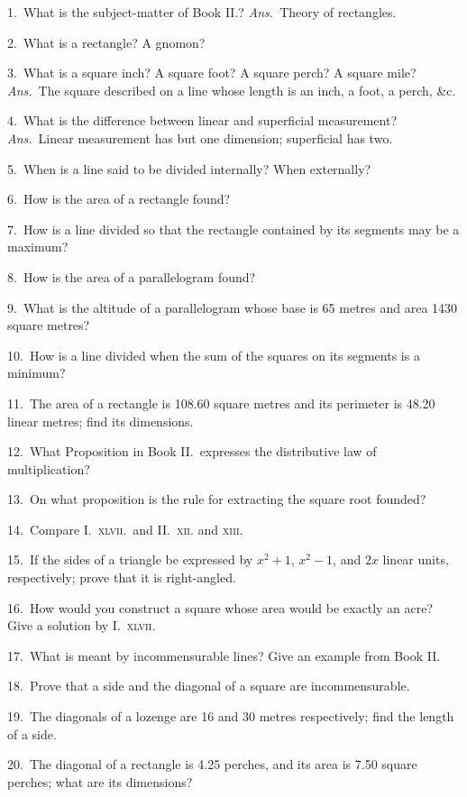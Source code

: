 \documentclass[oneside]{book}
\begin{document}
\begin{footnotesize}
1.~What is the subject-matter of Book II\@.? \emph{Ans.}\ Theory of
rectangles.

2.~What is a rectangle? A gnomon?

3.~What is a square inch? A square foot? A square perch?
A square mile? \emph{Ans.}\ The square described on a line whose
length is an inch, a foot, a perch, \&c.

4.~What is the difference between linear and superficial measurement?
\emph{Ans.}\ Linear measurement has but one dimension;
superficial has two.

5.~When is a line said to be divided internally? When externally?

6.~How is the area of a rectangle found?

7.~How is a line divided so that the rectangle contained by its
segments may be a maximum?

8.~How is the area of a parallelogram found?

9.~What is the altitude of a parallelogram whose base is 65
metres and area 1430 square metres?

10.~How is a line divided when the sum of the squares on its
segments is a minimum?

11.~The area of a rectangle is 108.60 square metres and its
perimeter is 48.20 linear metres; find its dimensions.

12.~What Proposition in Book II\@.\ expresses the distributive
law of multiplication?

13.~On what proposition is the rule for extracting the square
root founded?

14.~Compare I.~\textsc{xlvii.}\ and II\@.~\textsc{xii.} and \textsc{xiii}.

15.~If the sides of a triangle be expressed by $x^2 + 1$, $x^2 - 1$,
and $2x$ linear units, respectively; prove that it is right-angled.

16.~How would you construct a square whose area would be
exactly an acre? Give a solution by I.~\textsc{xlvii}.

17.~What is meant by incommensurable lines? Give an example
from Book II\@.

18.~Prove that a side and the diagonal of a square are incommensurable.

19.~The diagonals of a lozenge are 16 and 30 metres respectively;
find the length of a side.

20.~The diagonal of a rectangle is 4.25 perches, and its area is
7.50 square perches; what are its dimensions?


\end{footnotesize}
\end{document}
